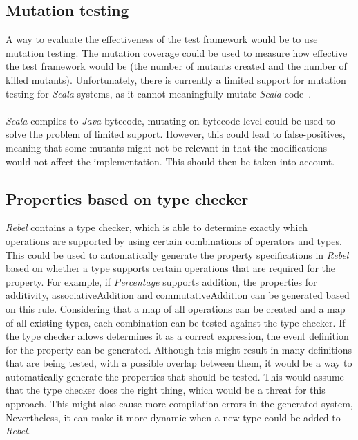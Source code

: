 \subsection*{Mutation testing}
A way to evaluate the effectiveness of the test framework would be to use
mutation testing. The mutation coverage could be used to measure how
effective the test framework would be (the number of mutants created and the
number of killed mutants). Unfortunately, there is currently a limited support
for mutation testing for \textit{Scala} systems, as it cannot meaningfully
mutate \textit{Scala} code~\cite{siteSbtPit2017}.\\
\\
\textit{Scala} compiles to \textit{Java} bytecode, mutating on bytecode level
could be used to solve the problem of limited support. However, this could lead
to false-positives, meaning that some mutants might not be relevant in that the
modifications would not affect the implementation. This should then be taken
into account.

\subsection*{Properties based on type checker}
\textit{Rebel} contains a type checker, which is able to determine exactly
which operations are supported by using certain combinations of operators and
types. This could be used to automatically generate the property specifications
in \textit{Rebel} based on whether a type supports certain operations that are
required for the property. For example, if \textit{Percentage} supports
addition, the properties for additivity, associativeAddition and
commutativeAddition can be generated based on this rule. Considering that a map
of all operations can be created and a map of all existing types, each
combination can be tested against the type checker. If the type checker allows
determines it as a correct expression, the event definition for the property can
be generated. Although this might result in many definitions that are being
tested, with a possible overlap between them, it would be a way to automatically
generate the properties that should be tested. This would assume that the type
checker does the right thing, which would be a threat for this approach. This
might also cause more compilation errors in the generated system, Nevertheless,
it can make it more dynamic when a new type could be added to \textit{Rebel}.


